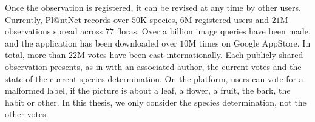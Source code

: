 Once the observation is registered, it can be revised at any time by other users.
Currently, Pl@ntNet records over $50$K species, $6$M registered users and $21$M observations spread across $77$ floras.
Over a billion image queries have been made, and the application has been downloaded over $10$M times on Google AppStore.
In total, more than $22$M votes have been cast internationally.
Each publicly shared observation presents, as in  with an associated author, the current votes and the state of the current species determination.
On the platform, users can vote for a malformed label, if the picture is about a leaf, a flower, a fruit, the bark, the habit or other. In this thesis, we only consider the species determination, not the other votes.

\begin{figure}[H]
    \centering
    \begin{minipage}{.55\linewidth}
        \centering
        \end{minipage}%
        \hfill
        \begin{minipage}{.4\linewidth}
        \centering

\end{minipage}
\end{figure}

